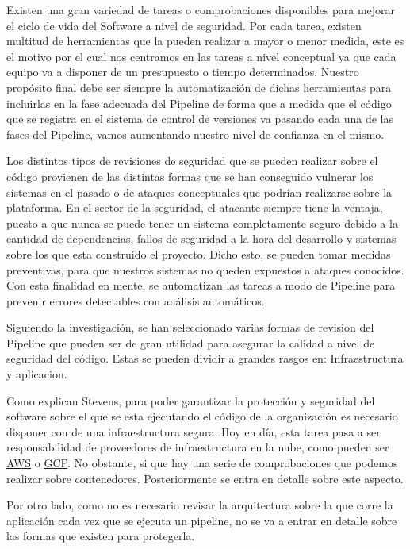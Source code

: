 \documentclass[12pt]{report} %
\begin{document}
Existen una gran variedad de tareas o comprobaciones disponibles para mejorar el
ciclo de vida del Software a nivel de seguridad.  Por cada tarea, existen
multitud de herramientas que la pueden realizar a mayor o menor medida, este es
el motivo por el cual nos centramos en las tareas a nivel conceptual ya que cada
equipo va a disponer de un presupuesto o tiempo determinados.  Nuestro propósito
final debe ser siempre la automatización de dichas herramientas para incluirlas
en la fase adecuada del Pipeline de forma que a medida que el código que se
registra en el sistema de control de versiones va pasando cada una de las fases
del Pipeline, vamos aumentando nuestro nivel de confianza en el mismo.

Los distintos tipos de revisiones de seguridad que se pueden realizar sobre el
código provienen de las distintas formas que se han conseguido vulnerar los
sistemas en el pasado o de ataques conceptuales que podrían realizarse sobre la
plataforma.  En el sector de la seguridad, el atacante siempre tiene la ventaja,
puesto a que nunca se puede tener un sistema completamente seguro debido a la
cantidad de dependencias, fallos de seguridad a la hora del desarrollo y
sistemas sobre los que esta construido el proyecto.  Dicho esto, se pueden tomar
medidas preventivas, para que nuestros sistemas no queden expuestos a ataques
conocidos.  Con esta finalidad en mente, se automatizan las tareas a modo de
Pipeline para prevenir errores detectables con análisis automáticos.

Siguiendo la investigación, se han seleccionado varias formas de revision del
Pipeline que pueden ser de gran utilidad para asegurar la calidad a nivel de
seguridad del código.  Estas se pueden dividir a grandes rasgos en:
Infraestructura y aplicacion.

Como explican \cite{Ensor2021} Stevens, para poder garantizar la protección y
seguridad del software sobre el que se esta ejecutando el código de la
organización es necesario disponer con de una infraestructura segura.  Hoy en
día, esta tarea pasa a ser responsabilidad de proveedores de infraestructura en
la nube, como pueden ser \href{https://aws.amazon.com/}{AWS} o
\href{https://console.cloud.google.com/}{GCP}.  No obstante, si que hay una
serie de comprobaciones que podemos realizar sobre contenedores.  Posteriormente
se entra en detalle sobre este aspecto.

Por otro lado, como no es necesario revisar la arquitectura sobre la que corre
la aplicación cada vez que se ejecuta un \Gls{pipeline}, no se va a entrar en
detalle sobre las formas que existen para protegerla.
\end{document}
